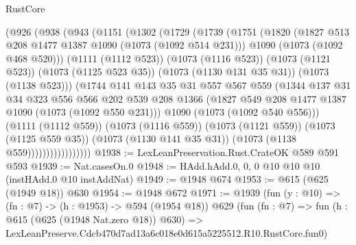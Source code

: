 \begin{lexlean}{RustCore}
\begin{coremodule}
                  (@926
                    (@938
                      (@943
                        (@1151
                          (@1302
                            (@1729
                              (@1739
                                (@1751
                                  (@1820
                                    (@1827 @513 @208 @1477 @1387 @1090 (@1073 (@1092 @514 @231)))
                                    @1090
                                    (@1073 (@1092 @468 @520)))
                                  (@1111 (@1112 @523))
                                  (@1073 (@1116 @523))
                                  (@1073 (@1121 @523))
                                  (@1073 (@1125 @523 @35))
                                  (@1073 (@1130 @131 @35 @31))
                                  (@1073 (@1138 @523)))
                                (@1744
                                  @141
                                  @143
                                  @35
                                  @31
                                  @557
                                  @567
                                  @559
                                  (@1344
                                    @137
                                    @31
                                    @34
                                    @323
                                    @556
                                    @566
                                    @202
                                    @539
                                    @208
                                    @1366
                                    (@1827 @549 @208 @1477 @1387 @1090 (@1073 (@1092 @550 @231)))
                                    @1090
                                    (@1073 (@1092 @540 @556)))
                                  (@1111 (@1112 @559))
                                  (@1073 (@1116 @559))
                                  (@1073 (@1121 @559))
                                  (@1073 (@1125 @559 @35))
                                  (@1073 (@1130 @141 @35 @31))
                                  (@1073 (@1138 @559)))))))))))))))))
@1938 := LexLeanPreservation.Rust.CrateOK @589 @591 @593
@1939 := Nat.casesOn.{0}
@1948 := HAdd.hAdd.{0, 0, 0} @10 @10 @10 (instHAdd.{0} @10 instAddNat)
@1949 := @1948 @674
@1953 := @615 (@625 (@1949 @18)) @630
@1954 := @1948 @672
@1971 := @1939
    (fun (y : @10) => (fn : @7) -> (h : @1953) -> @594 (@1954 @18))
    @629
    (fun (fn : @7) =>
    fun (h : @615 (@625 (@1948 Nat.zero @18)) @630) =>
    LexLeanPreserve.Cdcb470d7ad13a6c018e0d615a5225512.R10.RustCore.fun0)

\end{coremodule}
\end{lexlean}
